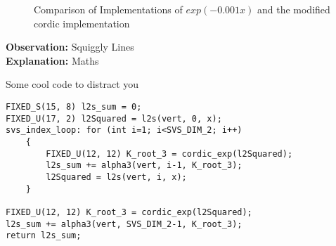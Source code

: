 \documentclass{article}
\begin{document}
\begin{figure}[h]
    \centering
    \caption{Comparison of Implementations of $exp(-0.001x)$ and the modified cordic implementation}
\end{figure}

\begin{obsbox}
    \textbf{Observation:} Squiggly Lines  \\
    \textbf{Explanation:} Maths
\end{obsbox}

Some cool code to distract you
\begin{verbatim}
FIXED_S(15, 8) l2s_sum = 0;
FIXED_U(17, 2) l2Squared = l2s(vert, 0, x);
svs_index_loop: for (int i=1; i<SVS_DIM_2; i++)
    {
        FIXED_U(12, 12) K_root_3 = cordic_exp(l2Squared);
        l2s_sum += alpha3(vert, i-1, K_root_3);
        l2Squared = l2s(vert, i, x);
    }

FIXED_U(12, 12) K_root_3 = cordic_exp(l2Squared);
l2s_sum += alpha3(vert, SVS_DIM_2-1, K_root_3);
return l2s_sum;
\end{verbatim}
\end{document}
